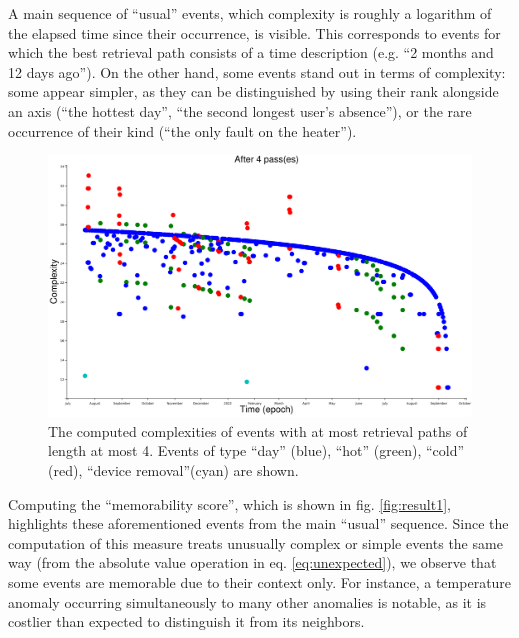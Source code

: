 \documentclass[conference]{IEEEtran}
\begin{document}
A main sequence of ``usual'' events, which complexity is roughly a logarithm of
the elapsed time since their occurrence, is visible. This corresponds to events
for which the best retrieval path consists of a time description (e.g. ``2
months and 12 days ago''). On the other hand, some events stand out in terms of
complexity: some appear simpler, as they can be distinguished by using their
rank alongside an axis (``the hottest day'', ``the second longest user's
absence''), or the rare occurrence of their kind (``the only fault on the heater'').

\begin{figure}[ht]
  \centering
  \includegraphics[width=\linewidth]{figures/complexities_computed}
  \caption{The computed complexities of events with at most retrieval paths of
    length at most 4. Events of type ``day'' (blue), ``hot'' (green), ``cold''
    (red), ``device removal''(cyan) are shown.}
  \label{fig:computed_cplx}
\end{figure}

Computing the ``memorability score'', which is shown in fig. \ref{fig:result1},
highlights these aforementioned events from the main ``usual'' sequence. Since
the computation of this measure treats unusually complex or simple events the
same way (from the absolute value operation in eq. \ref{eq:unexpected}), we
observe that some events are memorable due to their context only. For instance,
a temperature anomaly occurring simultaneously to many other anomalies is
notable, as it is costlier than expected to distinguish it from its neighbors.
\end{document}
